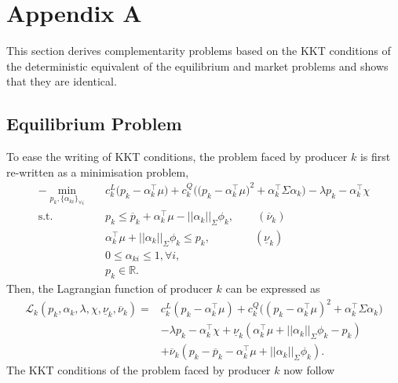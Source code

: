\documentclass{article}
\begin{document}
\section*{Appendix A}
This section derives complementarity problems based on the KKT conditions of the deterministic equivalent of the equilibrium and market problems and shows that they are identical.

\subsection*{Equilibrium Problem}
To ease the writing of KKT conditions, the problem faced by producer $k$ is first re-written as a minimisation problem,
\begin{align}
-\underset{p_k, \{\alpha_{ki}\}_{\forall i}}{\min} \hspace{10pt} &  c_k^L\big(p_k - \alpha_k^\top \mu\big) + c_k^Q \Big(\big(p_k - \alpha_{k}^\top \mu \big)^2 + \alpha_k^\top \Sigma \alpha_k\Big) - \lambda p_k - \alpha_k^\top \chi\\
\mbox{s.t. } & p_k \le \overline{p}_k + \alpha_k^\top \mu - ||\alpha_k||_{\Sigma} \phi_k, \hspace{25pt} (\overline{\nu}_k)\\
& \alpha_k^\top \mu + ||\alpha_k||_{\Sigma}\phi_k \le p_k, \hspace{48pt}(\underline{\nu}_k)\\
& 0 \le \alpha_{ki} \le 1, \forall i,\\
& p_k \in \mathbb{R}.
\end{align}
Then, the Lagrangian function of producer $k$ can be expressed as
\begin{align*}
\mathcal{L}_k(p_k, \alpha_k, \lambda, \chi, \underline{\nu}_k, \overline{\nu}_k) =& c_k^L(p_k - \alpha_k^\top \mu) + c_k^Q \big((p_k - \alpha_k^\top \mu)^2 + \alpha_k^\top \Sigma \alpha_k\big)\\
&- \lambda p_k - \alpha_k^\top \chi + \underline{\nu}_k(\alpha_k^\top \mu + ||\alpha_k||_{\Sigma} \phi_k - p_k)\\
&+ \overline{\nu}_k (p_k - \overline{p}_k - \alpha_k^\top \mu + ||\alpha_k||_{\Sigma} \phi_k).
\end{align*}
The KKT conditions of the problem faced by producer $k$ now follow
\end{document}
